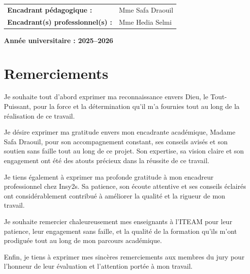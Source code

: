 \documentclass[a4paper,12pt]{report}
\begin{document}
\begin{titlepage}
\begin{center}
\vspace{0.5cm}

\begin{tabular}{ll}
    \textbf{Encadrant p\'{e}dagogique :} & Mme Safa Draouil \\[0.3cm]
    \textbf{Encadrant(s) professionnel(s) :} & Mme Hedia Selmi \\[0.3cm]
\end{tabular}

\vfill

{\large \textbf{Ann\'{e}e universitaire : 2025--2026}}

\end{center}
\end{titlepage}

\setcounter{page}{1}

\newpage
\thispagestyle{empty}
\chapter*{Remerciements}

Je souhaite tout d'abord exprimer ma reconnaissance envers Dieu, le Tout-Puissant, pour la force et la d\'{e}termination qu'il m'a fournies tout au long de la r\'{e}alisation de ce travail.

Je d\'{e}sire exprimer ma gratitude envers mon encadrante acad\'{e}mique, Madame Safa Draouil, pour son accompagnement constant, ses conseils avis\'{e}s et son soutien sans faille tout au long de ce projet. Son expertise, sa vision claire et son engagement ont \'{e}t\'{e} des atouts pr\'{e}cieux dans la r\'{e}ussite de ce travail.

Je tiens \'{e}galement \`{a} exprimer ma profonde gratitude \`{a} mon encadreur professionnel chez Insy2s. Sa patience, son \'{e}coute attentive et ses conseils \'{e}clair\'{e}s ont consid\'{e}rablement contribu\'{e} \`{a} am\'{e}liorer la qualit\'{e} et la rigueur de mon travail.

Je souhaite remercier chaleureusement mes enseignants \`{a} l'ITEAM pour leur patience, leur engagement sans faille, et la qualit\'{e} de la formation qu'ils m'ont prodigu\'{e}e tout au long de mon parcours acad\'{e}mique.

Enfin, je tiens \`{a} exprimer mes sinc\`{e}res remerciements aux membres du jury pour l'honneur de leur \'{e}valuation et l'attention port\'{e}e \`{a} mon travail.
\end{document}
